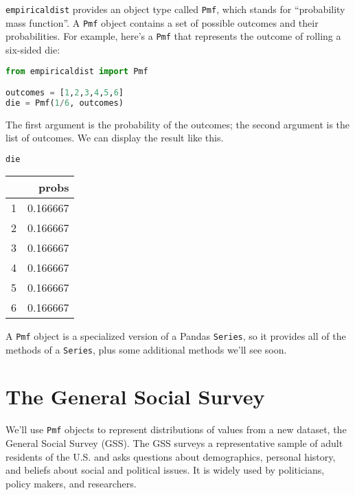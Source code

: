 \passthrough{\lstinline!empiricaldist!} provides an object type called
\passthrough{\lstinline!Pmf!}, which stands for ``probability mass
function''. A \passthrough{\lstinline!Pmf!} object contains a set of
possible outcomes and their probabilities. For example, here's a
\passthrough{\lstinline!Pmf!} that represents the outcome of rolling a
six-sided die:

\begin{lstlisting}[language=Python,style=source]
from empiricaldist import Pmf

outcomes = [1,2,3,4,5,6]
die = Pmf(1/6, outcomes)
\end{lstlisting}

The first argument is the probability of the outcomes; the second
argument is the list of outcomes. We can display the result like this.

\begin{lstlisting}[language=Python,style=source]
die
\end{lstlisting}

\begin{tabular}{lr}
\midrule
 & probs \\
\midrule
1 & 0.166667 \\
2 & 0.166667 \\
3 & 0.166667 \\
4 & 0.166667 \\
5 & 0.166667 \\
6 & 0.166667 \\
\midrule
\end{tabular}

A \passthrough{\lstinline!Pmf!} object is a specialized version of a
Pandas \passthrough{\lstinline!Series!}, so it provides all of the
methods of a \passthrough{\lstinline!Series!}, plus some additional
methods we'll see soon.

\section{The General Social Survey}\label{the-general-social-survey}

We'll use \passthrough{\lstinline!Pmf!} objects to represent
distributions of values from a new dataset, the General Social Survey
(GSS). The GSS surveys a representative sample of adult residents of the
U.S. and asks questions about demographics, personal history, and
beliefs about social and political issues. It is widely used by
politicians, policy makers, and researchers.

